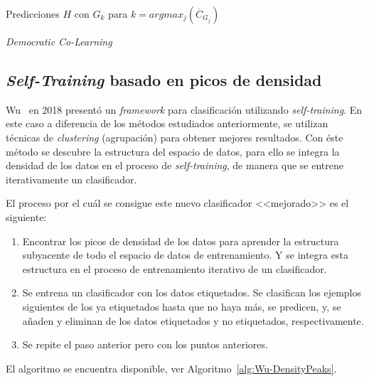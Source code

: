 \begin{algorithm}[H]
	\AlgoRestoreLineCount
	Predicciones $H$ con $G_k$ para $k = argmax_j\left(\overline{C}_{G_{j}}\right)$
	\caption{\textit{Democratic Co-Learning}}\label{alg:Democratic-Co-2}
\end{algorithm}

\subsection{\textit{Self-Training} basado en picos de densidad}
Wu~\cite{wu2018self} en 2018 presentó un \textit{framework} para clasificación utilizando \textit{self-training}. En este caso a diferencia de los métodos estudiados anteriormente, se utilizan técnicas de \textit{clustering} (agrupación) para obtener mejores resultados. Con éste método se descubre la  estructura del espacio de datos, para ello se integra la densidad de los datos en el proceso de \textit{self-training}, de manera que se entrene iterativamente un clasificador. 

El proceso por el cuál se consigue este nuevo clasificador <<mejorado>> es el siguiente:
\begin{enumerate}
\item Encontrar los picos de densidad de los datos para aprender la estructura subyacente de todo el espacio de datos de entrenamiento. Y se integra esta estructura en el proceso de entrenamiento iterativo de un clasificador.
\item Se entrena un clasificador con los datos etiquetados. Se clasifican los ejemplos siguientes de los ya etiquetados hasta que no haya más, se predicen, y, se añaden y eliminan de los datos etiquetados y no etiquetados, respectivamente.
\item Se repite el paso anterior pero con los puntos anteriores.
\end{enumerate}

El algoritmo se encuentra disponible, ver Algoritmo~\ref{alg:Wu-DensityPeaks}.

